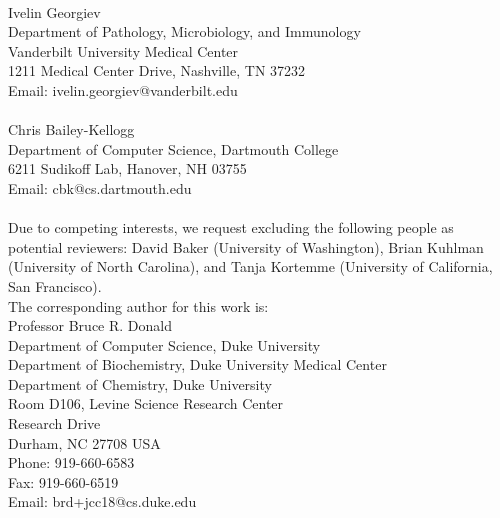 \documentclass[11pt, oneside]{article}   	%
\begin{document}
     \\\hspace{-0.285in} Ivelin Georgiev \\ Department of Pathology, Microbiology, and Immunology \\Vanderbilt University Medical Center \\ 1211 Medical Center Drive, Nashville, TN 37232  \\Email:  ivelin.georgiev@vanderbilt.edu \\
   \\\hspace{-0.285in} Chris Bailey-Kellogg \\Department of Computer Science, Dartmouth College \\6211 Sudikoff Lab, Hanover, NH 03755 \\Email: cbk@cs.dartmouth.edu \\
   \bigskip
   \\
   Due to competing interests, we request excluding the following people as potential reviewers: David Baker (University of Washington), Brian Kuhlman (University of North Carolina), and Tanja Kortemme (University of California, San Francisco).  
   \\
   
   The corresponding author for this work is: 
 \bigskip
 \\
    \hspace{-0.285in} Professor Bruce R. Donald \\Department of Computer Science, Duke University \\Department of Biochemistry, Duke University Medical Center  \\Department of Chemistry, Duke University \\Room D106, Levine Science Research Center \\Research Drive \\Durham, NC 27708 USA \\Phone: 919-660-6583 \\Fax: 919-660-6519 \\Email: brd+jcc18@cs.duke.edu \\
\end{document}
